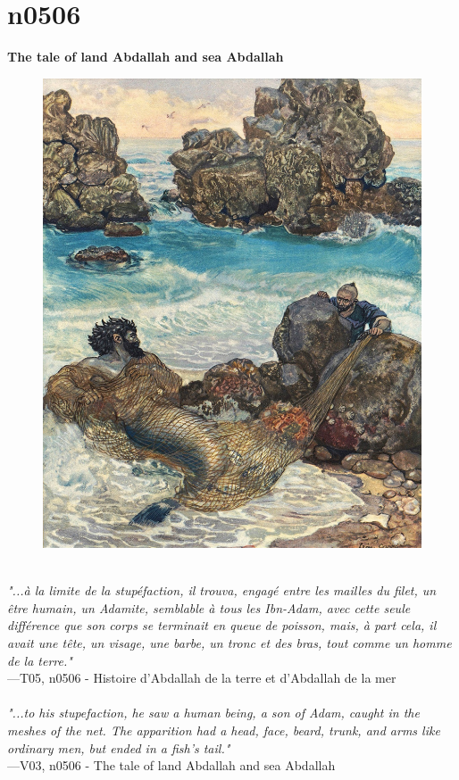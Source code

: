 \documentclass[../Carre_nights.tex]{subfiles}
\begin{document}
\newpage

\section{n0506}
\textbf{\Large{The tale of land Abdallah and sea Abdallah}} \\

\begin{figure}[ht]
\centering
\includegraphics[height=\figsize]{illustrations/volume_5/T05, n0506 - Histoire d'Abdallah de la terre et d'Abdallah de la mer.jpg}
\end{figure}

\textit{\\
"...à la limite de la stupéfaction, il trouva, engagé entre les mailles du filet, un être humain, un Adamite, semblable à tous les Ibn-Adam, avec cette seule différence que son corps se terminait en queue de poisson, mais, à part cela, il avait une tête, un visage, une barbe, un tronc et des bras, tout comme un homme de la terre."} \\
—T05, n0506 - Histoire d'Abdallah de la terre et d'Abdallah de la mer \\~\\
\textit{"...to his stupefaction, he saw a human being, a son of Adam, caught in the meshes of the net. The apparition had a head, face, beard, trunk, and arms like ordinary men, but ended in a fish's tail."} \\
—V03, n0506 - The tale of land Abdallah and sea Abdallah
\end{document}
